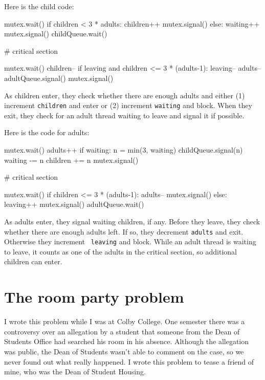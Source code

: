 \documentclass{book}
\begin{document}
Here is the child code:

\begin{unbreakable}[title={Extended child care solution (child)}]{}
mutex.wait()
 if children < 3 * adults:
  children++
  mutex.signal()
 else:
  waiting++
  mutex.signal()
  childQueue.wait()

# critical section

mutex.wait()
 children--
 if leaving and children <= 3 * (adults-1):
  leaving--
  adults--
  adultQueue.signal() 
mutex.signal()
\end{unbreakable}

As children enter, they check whether there are enough adults
and either (1) increment {\tt children} and enter or (2) increment
    {\tt waiting} and block.
When they exit, they check for an adult thread waiting to leave and
signal it if possible.


Here is the code for adults:

\begin{unbreakable}[title={Extended child care solution (adult)}]{}
mutex.wait()
    adults++
    if waiting:
        n = min(3, waiting)
        childQueue.signal(n)
        waiting -= n
        children += n
mutex.signal()

# critical section

mutex.wait()
    if children <= 3 * (adults-1):
        adults--
        mutex.signal()
    else:
        leaving++
        mutex.signal()
        adultQueue.wait() 
\end{unbreakable}

As adults enter, they signal waiting children, if any.  Before they
leave, they check whether there are enough adults left.  If so, they
decrement {\tt adults} and exit.  Otherwise they increment {\tt
        leaving} and block.  While an adult thread is waiting to leave, it
counts as one of the adults in the critical section, so additional
children can enter.






\section{The room party problem}

I wrote this problem while I was at Colby College.  One semester
there was a controversy over an allegation by a student that someone
from the Dean of Students Office had searched his room in his
absence.  Although the allegation was public, the Dean of Students
wasn't able to comment on the case, so we never found out what
really happened.  I wrote this problem to tease a friend of mine,
who was the Dean of Student Housing.
\end{document}
